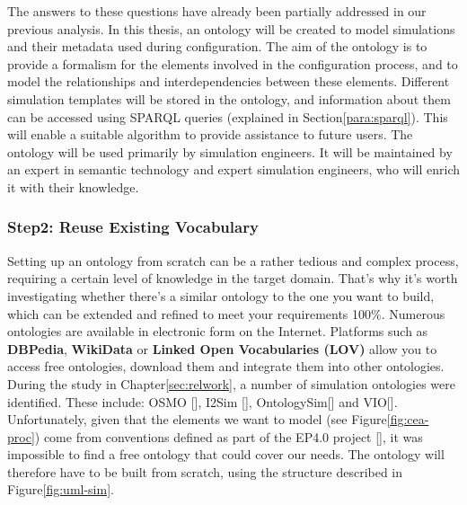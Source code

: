     The answers to these questions have already been partially addressed in our previous analysis. In this thesis, an ontology will be created to model simulations and their metadata used during configuration. The aim of the ontology is to provide a formalism for the elements involved in the configuration process, and to model the relationships and interdependencies between these elements. Different simulation templates will be stored in the ontology, and information about them can be accessed using SPARQL queries (explained in Section\ref{para:sparql}). This will enable a suitable algorithm to provide assistance to future users. The ontology will be used primarily by simulation engineers. It will be maintained by an expert in semantic technology and expert simulation engineers, who will enrich it with their knowledge.

    
    \subsubsection{Step2: Reuse Existing Vocabulary}
    Setting up an ontology from scratch can be a rather tedious and complex process, requiring a certain level of knowledge in the target domain. That's why it's worth investigating whether there's a similar ontology to the one you want to build, which can be extended and refined to meet your requirements 100\%. Numerous ontologies are available in electronic form on the Internet. Platforms such as \textbf{DBPedia}, \textbf{WikiData} or \textbf{Linked Open Vocabularies (LOV)} allow you to access free ontologies, download them and integrate them into other ontologies.\\
    
    During the study in Chapter\ref{sec:relwork}, a number of simulation ontologies were identified. These include: OSMO [], I2Sim [], OntologySim[] and VIO[]. Unfortunately, given that the elements we want to model (see Figure\ref{fig:cea-proc}) come from conventions defined as part of the EP4.0 project [], it was impossible to find a free ontology that could cover our needs. The ontology will therefore have to be built from scratch, using the structure described in Figure\ref{fig:uml-sim}.


